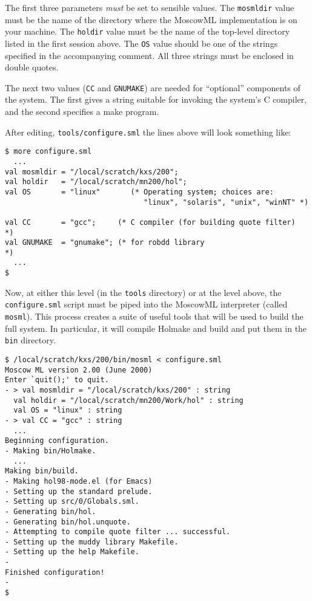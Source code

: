 The first three parameters \emph{must} be set to sensible values.  The
\texttt{mosmldir} value must be the name of the directory where the
MoscowML implementation is on your machine.  The \texttt{holdir} value
must be the name of the top-level directory listed in the first
session above.  The \texttt{OS} value should be one of the strings
specified in the accompanying comment.   All three strings must be
enclosed in double quotes.

The next two values (\texttt{CC} and \texttt{GNUMAKE}) are needed for
``optional'' components of the system.  The first gives a string
suitable for invoking the system's C compiler, and the second
specifies a \textsf{make} program.

After editing, \texttt{tools/configure.sml} the lines above will look
something like:

\begin{session}
\begin{verbatim}
$ more configure.sml
  ...
val mosmldir = "/local/scratch/kxs/200";
val holdir   = "/local/scratch/mn200/hol";
val OS       = "linux"       (* Operating system; choices are:
                                "linux", "solaris", "unix", "winNT" *)

val CC       = "gcc";     (* C compiler (for building quote filter)        *)
val GNUMAKE  = "gnumake"; (* for robdd library                             *)
  ...
$
\end{verbatim}
\end{session}

\noindent Now, at either this level (in the \texttt{tools} directory)
or at the level above, the \texttt{configure.sml} script must be piped
into the MoscowML interpreter (called \texttt{mosml}).  This process
creates a suite of useful tools that will be used to build the full
system.  In particular, it will compile \textsf{Holmake} and
\textsf{build} and put them in the \texttt{bin} directory.

\begin{session}
\begin{verbatim}
$ /local/scratch/kxs/200/bin/mosml < configure.sml
Moscow ML version 2.00 (June 2000)
Enter `quit();' to quit.
- > val mosmldir = "/local/scratch/kxs/200" : string
  val holdir = "/local/scratch/mn200/Work/hol" : string
  val OS = "linux" : string
- > val CC = "gcc" : string
  ...
Beginning configuration.
- Making bin/Holmake.
  ...
Making bin/build.
- Making hol98-mode.el (for Emacs)
- Setting up the standard prelude.
- Setting up src/0/Globals.sml.
- Generating bin/hol.
- Generating bin/hol.unquote.
- Attempting to compile quote filter ... successful.
- Setting up the muddy library Makefile.
- Setting up the help Makefile.
-
Finished configuration!
-
$
\end{verbatim}
\end{session}

